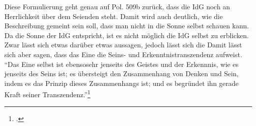 Diese Formulierung geht genau auf Pol. 509b zurück, dass die IdG noch an Herrlichkeit über dem Seienden steht. Damit wird auch deutlich, wie die Beschreibung gemeint sein soll, dass man nicht in die Sonne selbst schauen kann. Da die Sonne der IdG entspricht, ist es nicht möglich die IdG selbst zu erblicken. Zwar lässt sich etwas darüber etwas aussagen, jedoch lässt sich die 
Damit lässt sich aber sagen, dass das Eine die Seins- und Erkenntnistranszendenz aufweist. \enquote{Das Eine selbst ist ebensosehr jenseits des Geistes und der Erkennnis, wie es jenseits des Seins ist; es übersteigt den Zusammenhang von Denken und Sein, indem es das Prinzip dieses Zusammenhangs ist; und es begründet ihn gerade Kraft seiner Transzendenz.}\footcite[][S. 102]{halfwassen2015spuren}
